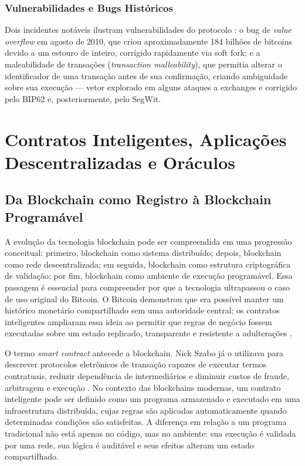 \documentclass[12pt,a4paper]{report}
\begin{document}
\subsection{Vulnerabilidades e Bugs Históricos}

Dois incidentes notáveis ilustram vulnerabilidades do protocolo \cite{Bashir2023}: o bug de \textit{value overflow} em agosto de 2010, que criou aproximadamente 184 bilhões de bitcoins devido a um estouro de inteiro, corrigido rapidamente via soft fork; e a maleabilidade de transações (\textit{transaction malleability}), que permitia alterar o identificador de uma transação antes de sua confirmação, criando ambiguidade sobre sua execução --- vetor explorado em alguns ataques a exchanges e corrigido pelo BIP62 e, posteriormente, pelo SegWit.

\chapter{Contratos Inteligentes, Aplicações Descentralizadas e Oráculos}

\section{Da Blockchain como Registro à Blockchain Programável}

A evolução da tecnologia blockchain pode ser compreendida em uma progressão conceitual: primeiro, blockchain como sistema distribuído; depois, blockchain como rede descentralizada; em seguida, blockchain como estrutura criptográfica de validação; por fim, blockchain como ambiente de execução programável. Essa passagem é essencial para compreender por que a tecnologia ultrapassou o caso de uso original do Bitcoin. O Bitcoin demonstrou que era possível manter um histórico monetário compartilhado sem uma autoridade central; os contratos inteligentes ampliaram essa ideia ao permitir que regras de negócio fossem executadas sobre um estado replicado, transparente e resistente a adulterações \cite{Bashir2023}.

O termo \textit{smart contract} antecede a blockchain. Nick Szabo já o utilizava para descrever protocolos eletrônicos de transação capazes de executar termos contratuais, reduzir dependência de intermediários e diminuir custos de fraude, arbitragem e execução \cite{Szabo1997}. No contexto das blockchains modernas, um contrato inteligente pode ser definido como um programa armazenado e executado em uma infraestrutura distribuída, cujas regras são aplicadas automaticamente quando determinadas condições são satisfeitas. A diferença em relação a um programa tradicional não está apenas no código, mas no ambiente: sua execução é validada por uma rede, sua lógica é auditável e seus efeitos alteram um estado compartilhado.
\end{document}
